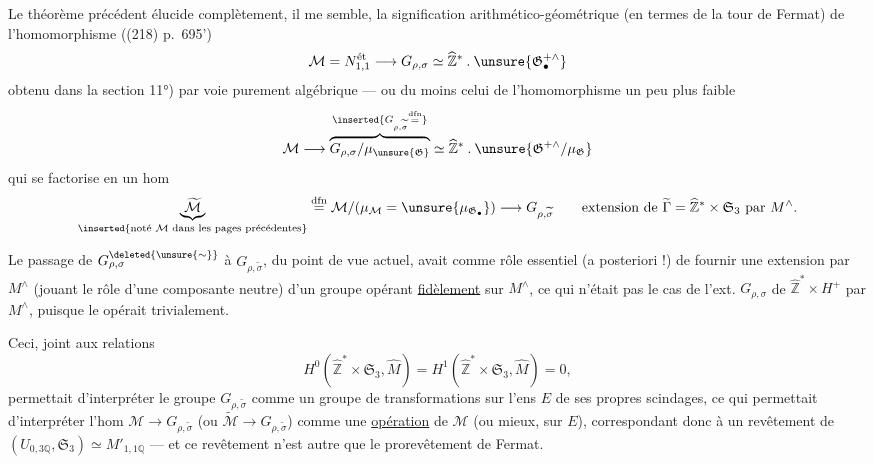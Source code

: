  Le théorème précédent élucide complètement, il me semble, la signification arithmético-géométrique (en termes de la tour de Fermat) de l'homomorphisme ((218) p.~695')
\[
\mathcal M=N_{1,1}^{\text{ét}}\longrightarrow G_{\rho,\sigma}\simeq\widehat{\mathbb Z}^{*}\mathbin{.}\unsure{\mathfrak G_{\bullet}^{+\wedge}}
\]
obtenu dans la section 11°) par voie purement algébrique --- ou du moins celui de l'homomorphisme un peu plus faible
\[
\mathcal M\longrightarrow\overbrace{G_{\rho,\sigma}/\mu_{\unsure{\mathfrak G}}}^{\inserted{G_{\rho,\widetilde{\sigma}}\overset{\mathrm{dfn}}{=}}}\simeq\widehat{\mathbb Z}^{*}\mathbin{.}\unsure{\mathfrak G^{+\wedge}/\mu_{\mathfrak G}}
\]
qui se factorise  en un hom
\[
\underbrace{\widetilde{\mathcal M}}_{\inserted{\text{noté }\mathcal M\text{ dans les pages précédentes}}}\overset{\mathrm{dfn}}{=}\mathcal M/(\mu_{\mathcal M}=\unsure{\mu_{\mathfrak G_\bullet}})\longrightarrow G_{\rho,\widetilde{\sigma}}
\qquad\text{extension de }\widetilde\Gamma=\widehat{\mathbb Z}^{*}\times\mathfrak S_3\text{ par }M^\wedge.
\]

Le passage de $G_{\rho,\sigma}^{\deleted{\unsure{\sim}}}$ à $G_{\rho,\widetilde{\sigma}}$, du point de vue actuel, avait comme rôle essentiel (a posteriori !) de fournir une extension par $M^\wedge$ (jouant le rôle d'une composante neutre) d'un groupe opérant \uline{fidèlement} sur $M^\wedge$, ce qui n'était pas le cas de l'ext. $G_{\rho,\sigma}$ de $\widehat{\mathbb Z}^{*}\times H^+$ par $M^\wedge$, puisque le   opérait trivialement.



Ceci, joint aux relations
\[
H^0(\widehat{\mathbb Z}^{*}\times\mathfrak S_3,\widehat M)=H^1(\widehat{\mathbb Z}^{*}\times\mathfrak S_3,\widehat M)=0,
\]
permettait d'interpréter le groupe $G_{\rho,\widetilde\sigma}$ comme un groupe de transformations sur l'ens $E$ de ses propres scindages, ce qui permettait d'interpréter l'hom $\mathcal M\to G_{\rho,\widetilde\sigma}$ (ou $\widetilde{\mathcal M}\to G_{\rho,\widetilde\sigma}$) comme une  \uline{opération} de $\mathcal M$  (ou mieux,  sur $E$), correspondant donc à un revêtement  de $(U_{0,3\mathbb Q},\mathfrak S_3)\simeq M'_{1,1\mathbb Q}$ --- et ce revêtement n'est autre que le prorevêtement de Fermat.

